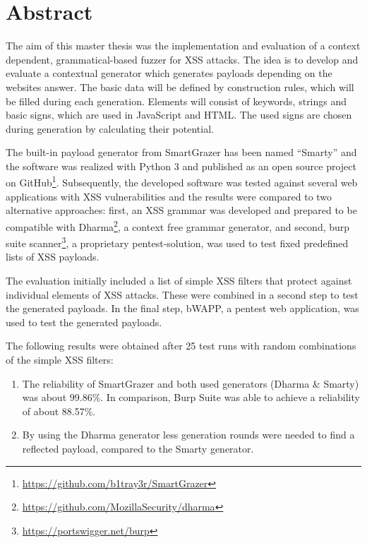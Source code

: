 \chapter*{Abstract}

The aim of this master thesis was the implementation and evaluation of a context dependent, grammatical-based fuzzer for XSS attacks. The idea is to develop and evaluate a contextual generator which generates payloads depending on the websites answer. The basic data will be defined by construction rules, which will be filled during each generation. Elements will consist of keywords, strings and basic signs, which are used in JavaScript and HTML. The used signs are chosen during generation by calculating their potential.

The built-in payload generator from SmartGrazer has been named ``Smarty'' and the software was realized with Python 3 and published as an open source project on GitHub\footnote{\url{https://github.com/b1tray3r/SmartGrazer}}. Subsequently, the developed software was tested against several web applications with XSS vulnerabilities and the results were compared to two alternative approaches: first, an XSS grammar was developed and prepared to be compatible with Dharma\footnote{\url{https://github.com/MozillaSecurity/dharma}}, a context free grammar generator, and second, burp suite scanner\footnote{\url{https://portswigger.net/burp}}, a proprietary pentest-solution, was used to test fixed predefined lists of XSS payloads.

The evaluation initially included a list of simple XSS filters that protect against individual
elements of XSS attacks. These were combined in a second step to test the generated
payloads. In the final step, bWAPP, a pentest web application, was used to test the generated payloads.

The following results were obtained after 25 test runs with random combinations of the simple XSS filters:

\begin{enumerate}
	\item The reliability of SmartGrazer and both used generators (Dharma \& Smarty) was about 99.86\%. In comparison, Burp Suite was able to achieve a reliability of about 88.57\%.
	
	\item By using the Dharma generator less generation rounds were needed to find a reflected payload, compared to the Smarty generator.
\end{enumerate}

